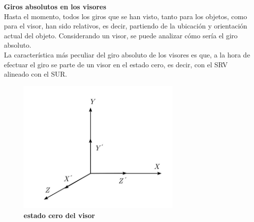 \textbf{Giros absolutos en los visores} \\
Hasta el momento, todos los giros que se han visto, tanto para los objetos, como para el visor, han sido relativos, es decir, partiendo de la ubicación y orientación actual del objeto. Considerando un visor, se puede analizar cómo sería el giro absoluto.\\
La característica más peculiar del giro absoluto de los visores es que, a la hora de efectuar el giro se parte de un visor en el estado cero, es decir, con el SRV alineado con el SUR.

\begin{figure}[h]
\includegraphics[width=8cm]{Img/GEO/geo-visor-7.jpg}
\centering
    \caption{\footnotesize{\textbf{estado cero del visor}}}
    \label{geo-visor7}
\end{figure}

